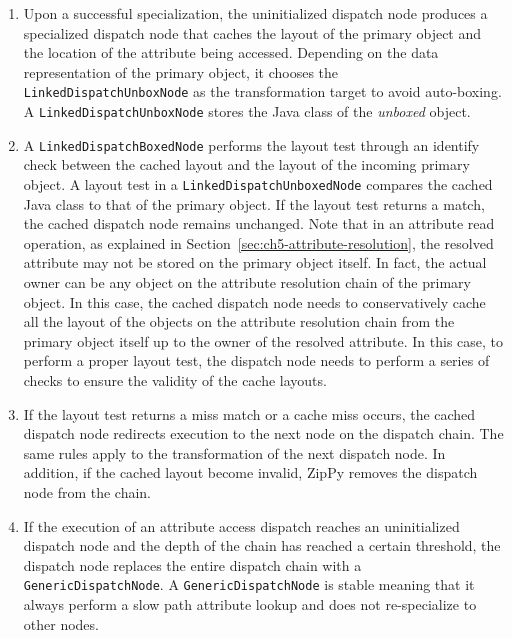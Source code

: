 \begin{enumerate}

\item Upon a successful specialization, the uninitialized dispatch node produces a specialized dispatch node that caches the layout of the primary object and the location of the attribute being accessed.
Depending on the data representation of the primary object, it chooses the \texttt{LinkedDispatchUnboxNode} as the transformation target to avoid auto-boxing.
A \texttt{LinkedDispatchUnboxNode} stores the Java class of the \emph{unboxed} object.

\item A \texttt{LinkedDispatchBoxedNode} performs the layout test through an identify check between the cached layout and the layout of the incoming primary object.
A layout test in a \texttt{LinkedDispatchUnboxedNode} compares the cached Java class to that of the primary object.
If the layout test returns a match, the cached dispatch node remains unchanged.
Note that in an attribute read operation, as explained in Section~\ref{sec:ch5-attribute-resolution}, the resolved attribute may not be stored on the primary object itself.
In fact, the actual owner can be any object on the attribute resolution chain of the primary object.
In this case, the cached dispatch node needs to conservatively cache all the layout of the objects on the attribute resolution chain from the primary object itself up to the owner of the resolved attribute.
In this case, to perform a proper layout test, the dispatch node needs to perform a series of checks to ensure the validity of the cache layouts.

\item If the layout test returns a miss match or a cache miss occurs, the cached dispatch node redirects execution to the next node on the dispatch chain.
The same rules apply to the transformation of the next dispatch node.
In addition, if the cached layout become invalid, ZipPy removes the dispatch node from the chain.

\item If the execution of an attribute access dispatch reaches an uninitialized dispatch node and the depth of the chain has reached a certain threshold,
the dispatch node replaces the entire dispatch chain with a \texttt{GenericDispatchNode}.
A \texttt{GenericDispatchNode} is stable meaning that it always perform a slow path attribute lookup and does not re-specialize to other nodes.

\end{enumerate}

